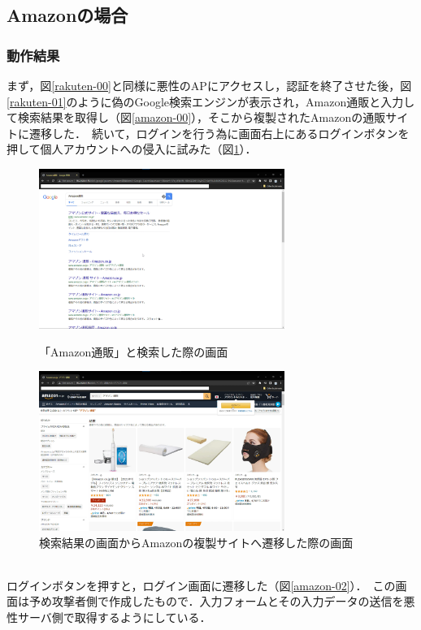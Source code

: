 \documentclass[dvipdfmx,twocolumn,9pt]{jsarticle}
\begin{document}
        \subsection{Amazonの場合}
            \subsubsection{動作結果}
                まず，図\ref{rakuten-00}と同様に悪性のAPにアクセスし，認証を終了させた後，図\ref{rakuten-01}のように偽のGoogle検索エンジンが表示され，Amazon通販と入力して検索結果を取得し（図\ref{amazon-00}），そこから複製されたAmazonの通販サイトに遷移した．\
                続いて，ログインを行う為に画面右上にあるログインボタンを押して個人アカウントへの侵入に試みた（図\ref{amazon-01}）．\
                \begin{figure}[h]
                    \centering
                    \includegraphics[width=8cm]{img/amazon/amazon-00.png}
                    \caption{「Amazon通販」と検索した際の画面}
                    \label{amazon-00}
                    \includegraphics[width=8cm]{img/amazon/amazon-01.png}
                    \caption{検索結果の画面からAmazonの複製サイトへ遷移した際の画面}
                    \label{amazon-01}
                \end{figure}
                \\
                ログインボタンを押すと，ログイン画面に遷移した（図\ref{amazon-02}）．\
                この画面は予め攻撃者側で作成したもので．入力フォームとその入力データの送信を悪性サーバ側で取得するようにしている．\
\end{document}
